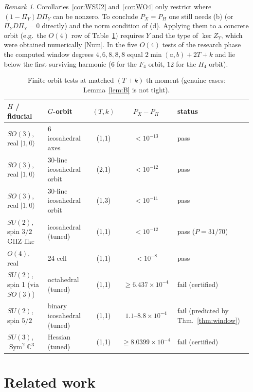 \documentclass[11pt]{article}
\newcommand{\C}{\mathbb{C}}
\newcommand{\Sym}{\operatorname{Sym}}
\newcommand{\ket}[1]{\lvert #1\rangle}
\theoremstyle{definition}
\theoremstyle{remark}
\newtheorem{remark}[theorem]{Remark}
\begin{document}
\begin{remark}
Corollaries~\ref{cor:WSU2} and~\ref{cor:WO4} only restrict where $(1-\Pi_Y)D\Pi_Y$ can be nonzero. To conclude $P_X=P_H$ one still needs
(b) (or $\Pi_YD\Pi_Y=0$ directly) and the norm condition of (d). Applying them to a concrete orbit (e.g.\ the $O(4)$ row of Table~\ref{tab:nonab}) requires $Y$ and the type of $\ker Z_Y$, which
were obtained numerically [Num]. In the five $O(4)$ tests of the research phase the computed window degrees $4,6,8,8,8$ equal
$2\min(a,b)+2T+k$ and lie below the first surviving harmonic ($6$ for the $F_4$ orbit, $12$ for the $H_4$ orbit).
\end{remark}

\begin{table}[t]\centering
\caption{Finite-orbit tests at matched $(T+k)$-th moment (genuine cases: Lemma~\ref{lem:B} is not tight).}\label{tab:nonab}
\begin{tabular}{llccl}\toprule
$H$ / fiducial & $G$-orbit & $(T,k)$ & $P_X-P_H$ & status\\\midrule
$SO(3)$, real $\ket{1,0}$ & 6 icosahedral axes & (1,1) & $<10^{-13}$ & pass\\
$SO(3)$, real $\ket{1,0}$ & 30-line icosahedral orbit & (2,1) & $<10^{-12}$ & pass\\
$SO(3)$, real $\ket{1,0}$ & 30-line icosahedral orbit & (1,3) & $<10^{-11}$ & pass\\
$SU(2)$, spin $3/2$ GHZ-like & icosahedral (tuned) & (1,1) & $<10^{-12}$ & pass ($P=31/70$)\\
$O(4)$, real & 24-cell & (1,1) & $<10^{-8}$ & pass\\
$SU(2)$, spin 1 (via $SO(3)$) & octahedral (tuned) & (1,1) & $\ge6.437\times10^{-4}$ & fail (certified)\\
$SU(2)$, spin $5/2$ & binary icosahedral (tuned) & (1,1) & $1.1$--$8.8\times10^{-4}$ & fail (predicted by Thm.~\ref{thm:window})\\
$SU(3)$, $\Sym^2\C^3$ & Hessian (tuned) & (1,1) & $\ge8.0399\times10^{-4}$ & fail (certified)\\\bottomrule
\end{tabular}
\end{table}

\section{Related work}\label{sec:related}
\end{document}
